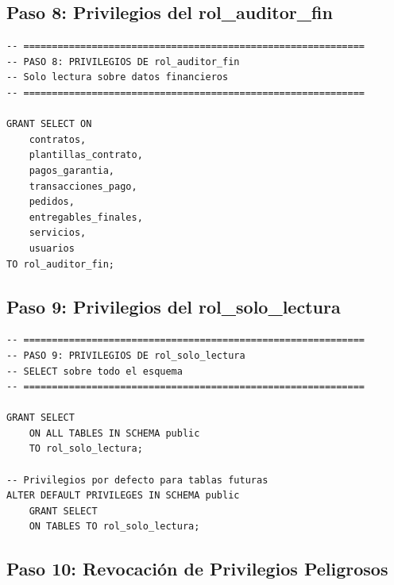 \documentclass[conference, onecolumn]{IEEEtran}
\begin{document}
\subsection{Paso 8: Privilegios del rol\_auditor\_fin}

\begin{lstlisting}[caption={Privilegios del auditor financiero}, label={lst:priv_auditor}]
-- ============================================================
-- PASO 8: PRIVILEGIOS DE rol_auditor_fin
-- Solo lectura sobre datos financieros
-- ============================================================

GRANT SELECT ON
    contratos,
    plantillas_contrato,
    pagos_garantia,
    transacciones_pago,
    pedidos,
    entregables_finales,
    servicios,
    usuarios
TO rol_auditor_fin;
\end{lstlisting}

\subsection{Paso 9: Privilegios del rol\_solo\_lectura}

\begin{lstlisting}[caption={Privilegios del rol de solo lectura}, label={lst:priv_readonly}]
-- ============================================================
-- PASO 9: PRIVILEGIOS DE rol_solo_lectura
-- SELECT sobre todo el esquema
-- ============================================================

GRANT SELECT
    ON ALL TABLES IN SCHEMA public
    TO rol_solo_lectura;

-- Privilegios por defecto para tablas futuras
ALTER DEFAULT PRIVILEGES IN SCHEMA public
    GRANT SELECT
    ON TABLES TO rol_solo_lectura;
\end{lstlisting}

\subsection{Paso 10: Revocación de Privilegios Peligrosos}
\end{document}
